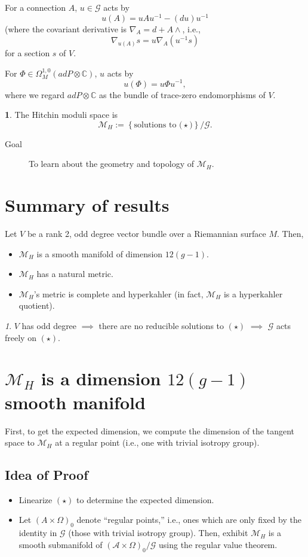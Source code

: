 \documentclass[oneside,english]{amsbook}
\numberwithin{section}{chapter}
\numberwithin{equation}{section}
\numberwithin{figure}{section}
\theoremstyle{plain}
\theoremstyle{definition}
\newtheorem{defn}[thm]{\protect\definitionname}
\theoremstyle{remark}
\newtheorem*{rem*}{\protect\remarkname}
\theoremstyle{definition}
\theoremstyle{definition}
\theoremstyle{plain}
\providecommand{\definitionname}{Definition}
\providecommand{\remarkname}{Remark}
\begin{document}
For a connection $A$, $u\in\mathcal{G}$ acts by 
\[
u\left(A\right)=uAu^{-1}-\left(du\right)u^{-1}
\]
(where the covariant derivative is $\nabla_{A}=d+A\wedge$, i.e.,
\[
\nabla_{u\left(A\right)}s=u\nabla_{A}\left(u^{-1}s\right)
\]
for a section $s$ of $V$.

For $\Phi\in\Omega_{M}^{1,0}\left(adP\otimes\mathbb{C}\right)$, $u$
acts by 
\[
u\left(\Phi\right)=u\Phi u^{-1},
\]
where we regard $adP\otimes\mathbb{C}$ as the bundle of trace-zero
endomorphisms of $V$.
\begin{defn}
The Hitchin moduli space is 
\[
\mathcal{M}_{H}:=\left\{ \mbox{solutions to (}\star\mbox{)}\right\} /\mathcal{G}.
\]
\end{defn}
\begin{description}
\item [{Goal}] To learn about the geometry and topology of $\mathcal{M}_{H}$.
\end{description}

\section{Summary of results}

Let $V$ be a rank 2, odd degree vector bundle over a Riemannian surface
$M$. Then, 
\begin{itemize}
\item $\mathcal{M}_{H}$ is a smooth manifold of dimension $12\left(g-1\right)$.
\item $\mathcal{M}_{H}$ has a natural metric.
\item $\mathcal{M}_{H}$'s metric is complete and hyperkahler (in fact,
$\mathcal{M}_{H}$ is a hyperkahler quotient).\end{itemize}
\begin{rem*}
$V$ has odd degree $\implies$ there are no reducible solutions to
$\left(\star\right)$ $\implies$ $\mathcal{G}$ acts freely on $\left(\star\right)$.
\end{rem*}

\section{$\mathcal{M}_{H}$ is a dimension $12\left(g-1\right)$ smooth manifold}

First, to get the expected dimension, we compute the dimension of
the tangent space to $\mathcal{M}_{H}$ at a regular point (i.e.,
one with trivial isotropy group). 


\subsection{Idea of Proof}
\begin{itemize}
\item Linearize $(\star)$ to determine the expected dimension.
\item Let $\left(A\times\Omega\right)_{0}$ denote ``regular points,''
i.e., ones which are only fixed by the identity in $\mathcal{G}$
(those with trivial isotropy group). Then, exhibit $\mathcal{M}_{H}$
is a smooth submanifold of $\left(\mathcal{A}\times\Omega\right)_{0}/\mathcal{G}$
using the regular value theorem.
\end{itemize}
\end{document}
